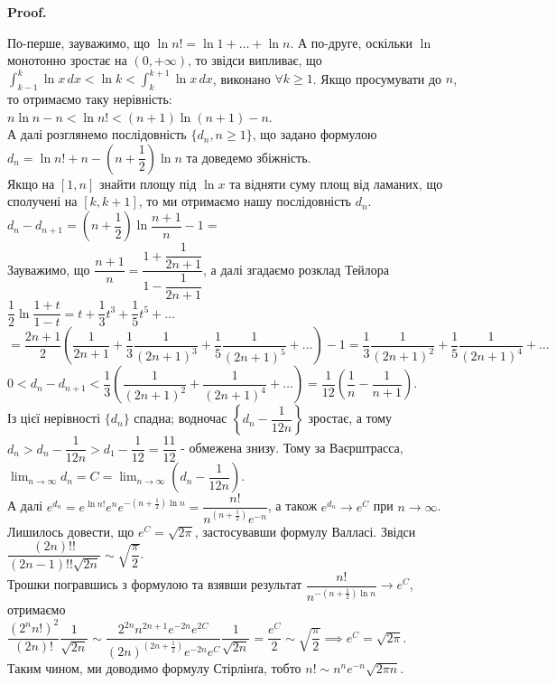\documentclass[a4paper, 10pt]{article}
\makeatletter
\def\huge{\displaystyle}
\def\qed{$\blacksquare$}
\theoremstyle{theoremdd}
\theoremstyle{theoremdd}
\theoremstyle{theoremdd}
\theoremstyle{theoremdd}
\theoremstyle{theoremdd}
\theoremstyle{theoremdd}
\theoremstyle{theoremdd}
\theoremstyle{theoremdd}
\theoremstyle{theoremdd}
\renewenvironment{proof}[1][Proof.\\]{\par
\pushQED{\hfill \qed}%
\normalfont \topsep6\p@\@plus6\p@\relax
\trivlist
\item\relax
{\bfseries
#1\@addpunct{.}}\hspace\labelsep\ignorespaces
}{%
\popQED\endtrivlist\@endpefalse
}
\makeatother
\begin{document}
\begin{proof}
По-перше, зауважимо, що $\ln n! = \ln 1 + \dots + \ln n$. А по-друге, оскільки $\ln$ монотонно зростає на $(0,+\infty)$, то звідси випливає, що\\
$\huge\int_{k-1}^k \ln x\,dx < \ln k < \int_k^{k+1} \ln x\,dx$, виконано $\forall k \geq 1$.
Якщо просумувати до $n$, то отримаємо таку нерівність:\\
$n \ln n - n < \ln n! < (n+1) \ln (n+1) - n$.\\
А далі розглянемо послідовність $\{ d_n, n \geq 1\}$, що задано формулою $d_n = \ln n! + n - \left( n + \dfrac{1}{2} \right) \ln n$ та доведемо збіжність.\\
Якщо на $[1,n]$ знайти площу під $\ln x$ та відняти суму площ від ламаних, що сполучені на $[k,k+1]$, то ми отримаємо нашу послідовність $d_n$.\\
$d_n - d_{n+1} = \left( n + \dfrac{1}{2} \right) \ln \dfrac{n+1}{n} - 1 \boxed{=}$\\
Зауважимо, що $\dfrac{n+1}{n} = \dfrac{1+\dfrac{1}{2n+1}}{1-\dfrac{1}{2n+1}}$, а далі згадаємо розклад Тейлора $\dfrac{1}{2} \ln \dfrac{1+t}{1-t} = t + \dfrac{1}{3}t^3 + \dfrac{1}{5}t^5 + \dots$\\
$= \dfrac{2n+1}{2} \left( \dfrac{1}{2n+1} + \dfrac{1}{3} \dfrac{1}{(2n+1)^3} + \dfrac{1}{5} \dfrac{1}{(2n+1)^5} + \dots \right) - 1 = \dfrac{1}{3} \dfrac{1}{(2n+1)^2} + \dfrac{1}{5} \dfrac{1}{(2n+1)^4} + \dots$\\
$0 < d_n - d_{n+1} < \dfrac{1}{3} \left( \dfrac{1}{(2n+1)^2} + \dfrac{1}{(2n+1)^4} + \dots \right) = \dfrac{1}{12} \left( \dfrac{1}{n} - \dfrac{1}{n+1} \right)$.\\
Із цієї нерівності $\{d_n \}$ спадна; водночас $\left \{ d_n - \dfrac{1}{12n} \right\}$ зростає, а тому $d_n > d_n - \dfrac{1}{12n} > d_1 - \dfrac{1}{12} = \dfrac{11}{12}$ - обмежена знизу. Тому за Ваєрштрасса, $\huge\lim_{n \to \infty} d_n = C = \lim_{n \to \infty} \left( d_n - \dfrac{1}{12n} \right)$.\\
А далі $e^{d_n} = e^{\ln n!} e^n e^{-\left( n + \frac{1}{2} \right) \ln n} = \dfrac{n!}{n^{\left( n + \frac{1}{2} \right)} e^{-n}}$, а також $e^{d_n} \to e^C$ при $n \to \infty$.\\
Лишилось довести, що $e^C = \sqrt{2 \pi}$, застосувавши формулу Валласі. Звідси $\dfrac{(2n)!!}{(2n-1)!! \sqrt{2n}} \sim \sqrt{\dfrac{\pi}{2}}$.\\
Трошки погравшись з формулою та взявши результат $\dfrac{n!}{n^{-\left( n + \frac{1}{2} \right) \ln n}} \to e^C$, отримаємо \\ $\dfrac{(2^n n!)^2}{(2n)!} \dfrac{1}{\sqrt{2n}} \sim \dfrac{2^{2n} n^{2n+1} e^{-2n} e^{2C}}{(2n)^{\left(2n+ \frac{1}{2} \right)} e^{-2n} e^C} \dfrac{1}{\sqrt{2n}} = \dfrac{e^C}{2} \sim \sqrt{\dfrac{\pi}{2}} \implies e^C = \sqrt{2\pi}$.\\
Таким чином, ми доводимо формулу Стірлінґа, тобто $n! \sim n^n e^{-n} \sqrt{2\pi n}$.
\end{proof}
\fi
\newpage
\end{document}
